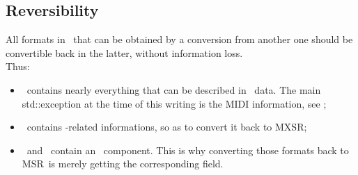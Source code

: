\subsection{Reversibility}\label{Reversibility}

All formats in \mf\ that can be obtained by a conversion from another one should be convertible back in the latter, without information loss.\\
Thus:
\begin{itemize}
\item \mxsrRepr\ contains nearly everything that can be described in \mxml\ data. The main std::exception at the time of this writing is the MIDI information, see ;
\item \msrRepr\ contains \mxml-related informations, so as to convert it back to MXSR;
\item \lpsrRepr\ and \bsrRepr\ contain an \msrRepr\ component. This is why converting those formats back to MSR\ is merely getting the corresponding field.
\end{itemize}

